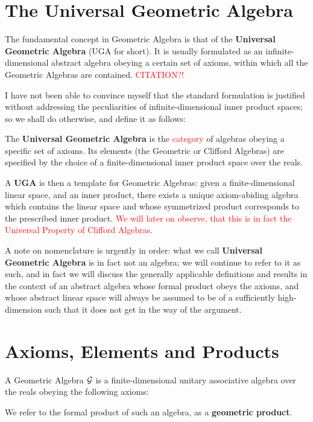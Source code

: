 \section{The Universal Geometric Algebra}

The fundamental concept in Geometric Algebra is that of the \textbf{Universal Geometric Algebra} (UGA for short). It is usually formulated as an infinite-dimensional abstract algebra obeying a certain set of axioms, within which all the Geometric Algebras are contained. \textcolor{red}{CITATION?!}

I have not been able to convince myself that the standard formulation is justified without addressing the peculiarities of infinite-dimensional inner product spaces; so we shall do otherwise, and define it as follows:
\begin{definition}
	The \textbf{Universal Geometric Algebra} is the \textcolor{red}{category} of algebras obeying a specific set of axioms. Its elements (the Geometric or Clifford Algebras) are specified by the choice of a finite-dimensional inner product space over the reals.
\end{definition}

A \textbf{UGA} is then a template for Geometric Algebras: given a finite-dimensional linear space, and an inner product, there exists a unique axiom-abiding algebra which contains the linear space and whose symmetrized product corresponds to the prescribed inner product. \textcolor{red}{We will later on observe, that this is in fact the Universal Property of Clifford Algebras}.

A note on nomenclature is urgently in order: what we call \textbf{Universal Geometric Algebra} is in fact not an algebra; we will continue to refer to it as such, and in fact we will discuss the generally applicable definitions and results in the context of an abstract algebra whose formal product obeys the axioms, and whose abstract linear space will always be assumed to be of a sufficiently high-dimension such that it does not get in the way of the argument.

\newpage

\section{Axioms, Elements and Products}

A Geometric Algebra $\mathcal{G}$  is a finite-dimensional unitary associative algebra over the reals obeying the following axioms:

We refer to the formal product of such an algebra, as a \textbf{geometric product}.

